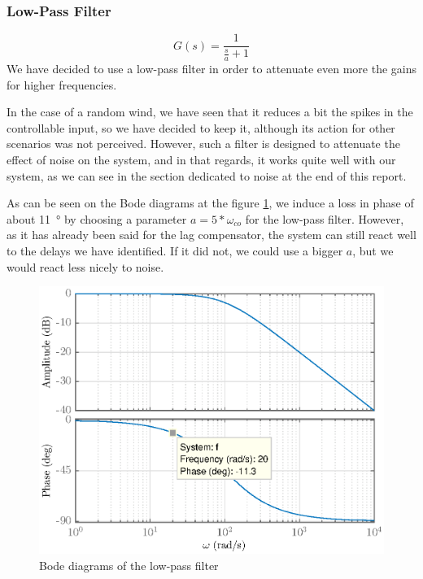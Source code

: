 \subsubsection{Low-Pass Filter}
$$
G(s) = \dfrac{1}{\frac{s}{a}+1}
$$
We have decided to use a low-pass filter in order to attenuate even more the gains for higher frequencies.\par
In the case of a random wind, we have seen that it reduces a bit the spikes in the controllable input, so we have decided to keep it, although its action for other scenarios was not perceived. However, such a filter is designed to attenuate the effect of noise on the system, and in that regards, it works quite well with our system, as we can see in the section dedicated to noise at the end of this report.\par
As can be seen on the Bode diagrams at the figure \ref{fig:lpf}, we induce a loss in phase of about \SI{11}{\degree} by choosing a parameter $a = 5*\omega_{co}$ for the low-pass filter. However, as it has already been said for the lag compensator, the system can still react well to the delays we have identified. If it did not, we could use a bigger $a$, but we would react less nicely to noise.
\begin{figure}[H]
    \centering
    \includegraphics[scale = 0.8]{resources/eps/4-Val/lpf.eps}
    \caption{Bode diagrams of the low-pass filter}
    \label{fig:lpf}
\end{figure}

